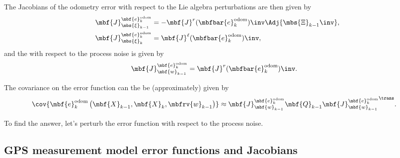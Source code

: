 \documentclass[ nobib, nofonts, notoc]{tufte-handout}
\begin{document}
    The Jacobians of the odometry error with respect to the Lie algebra perturbations are then given by
    \begin{align}
        \mbf{J}
            ^{\mbf{e}
                ^{\mathrm{odom}}
                _{k}}
            _{\mbs{\xi}_{k-1}} 
        &= 
        -\mbf{J}^{r}(\mbfbar{e}^{\mathrm{odom}}_{k})\inv
        \Adj{\mbs{\Xi}_{k-1}\inv}
        , \\
        \mbf{J}
            ^{\mbf{e}
                ^{\mathrm{odom}}
                _{k}}
            _{\mbs{\xi}_{k}} 
        &= 
        \mbf{J}^{\ell}(\mbfbar{e}^{\mathrm{odom}}_{k})\inv,       
    \end{align}
    and the with respect to the process noise is given by
    \begin{align}
        \mbf{J}
            ^{\mbf{e}
                ^{\mathrm{odom}}
                _{k}}
            _{\mbf{w}_{k-1}} 
        &=
        \mbf{J}^{r}(\mbfbar{e}^{\mathrm{odom}}_{k})\inv.
    \end{align}
    
    The covariance on the error function can the be (approximately) given by
    \begin{align}
        \cov{
            \mbf{e}
              ^{\mathrm{odom}}
              _{k}
            \left(
              \mbf{X}_{k-1},
              \mbf{X}_{k},
              \mbfrv{w}_{k-1}
            \right)
        }
        &\approx
        \mbf{J}
            ^{\mbf{e}
                ^{\mathrm{odom}}
                _{k}}
            _{\mbf{w}_{k-1}}
        \mbf{Q}_{k-1}
        {
        \mbf{J}
            ^{\mbf{e}
                ^{\mathrm{odom}}
                _{k}}
            _{\mbf{w}_{k-1}}
        }^{\trans}.
    \end{align}

    To find the answer, let's perturb the error function with respect to the process noise.
    \subsection{GPS measurement model error functions and Jacobians}
    
    
    \clearpage
    
    
\end{document}
